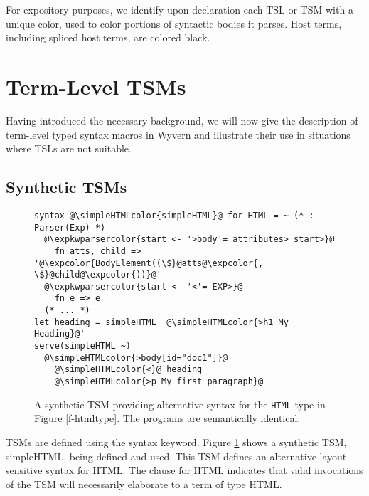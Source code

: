 \documentclass{sig-alternate}[10pt]
\makeatletter
\newcommand\BeraMonottfamily{%
  \def\fvm@Scale{0.85}%
  \fontfamily{fvm}\selectfont%
}
\newcommand{\expkwparsercolor}[1]{\textcolor[HTML]{336699}{#1}}
\newcommand{\expcolor}[1]{\textcolor[HTML]{FF0033}{#1}}
\newcommand{\simpleHTMLcolor}[1]{\textcolor[HTML]{7D5100}{#1}}
\newcommand{\mycaption}[1]{\vspace{-5px}\caption{#1}\vspace{-5px}}
\newcommand{\lstinlinew}[1]{{\scriptsize\BeraMonottfamily #1}}
\makeatother
\begin{document}
For expository purposes, we identify upon declaration each TSL or TSM with a unique color, used to color portions of syntactic bodies it parses. Host terms, including spliced host terms, are colored black. 

\section{Term-Level TSM\lowercase{s}}\label{tsms-term}
Having introduced the necessary background, we will now give the description of term-level typed syntax macros in Wyvern and illustrate their use in situations where TSLs are not suitable. %


\subsection{Synthetic TSMs}

\begin{figure}[t]
\begin{lstlisting}[style=wyvern]
syntax @\simpleHTMLcolor{simpleHTML}@ for HTML = ~ (* : Parser(Exp) *)
  @\expkwparsercolor{start <- '>body'= attributes> start>}@
    fn atts, child => '@\expcolor{BodyElement((\$}@atts@\expcolor{, \$}@child@\expcolor{))}@'
  @\expkwparsercolor{start <- '<'= EXP>}@
    fn e => e
  (* ... *)
let heading = simpleHTML '@\simpleHTMLcolor{>h1 My Heading}@'
serve(simpleHTML ~)
  @\simpleHTMLcolor{>body[id="doc1"]}@
    @\simpleHTMLcolor{<}@ heading
    @\simpleHTMLcolor{>p My first paragraph}@
\end{lstlisting}
\mycaption{A synthetic TSM providing alternative syntax for the \texttt{HTML} type in Figure \ref{f-htmltype}. The programs are semantically identical.}
\label{f-simplehtml}
\end{figure}
TSMs are defined using the \lstinlinew{syntax} keyword. Figure \ref{f-simplehtml} shows a synthetic TSM, \lstinlinew{simpleHTML}, being defined and used. This TSM defines an alternative layout-sensitive syntax for HTML. The clause \lstinlinew{for HTML} indicates that valid invocations of the TSM will necessarily elaborate to a term of type \lstinlinew{HTML}. 
\end{document}
